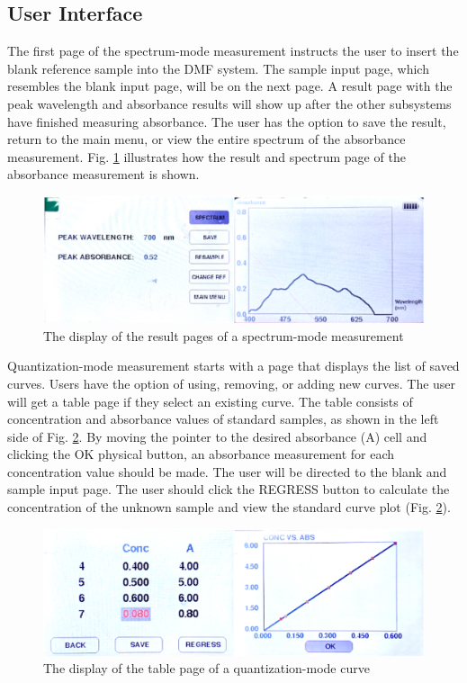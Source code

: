 \documentclass[conference]{IEEEtran}
\begin{document}
\subsection{User Interface}
The first page of the spectrum-mode measurement instructs the user to insert the blank reference sample into the DMF system.
The sample input page, which resembles the blank input page, will be on the next page.
A result page with the peak wavelength and absorbance results will show up after the other subsystems have finished measuring absorbance.
The user has the option to save the result, return to the main menu, or view the entire spectrum of the absorbance measurement.
Fig. \ref{lcd-spec} illustrates how the result and spectrum page of the absorbance measurement is shown.

    \begin{figure}[htbp]
    \centerline{\includegraphics[scale=0.06]{lcd-spec.JPEG}}
    \caption{The display of the result pages of a spectrum-mode measurement}
    \label{lcd-spec}
    \end{figure}

Quantization-mode measurement starts with a page that displays the list of saved curves.
Users have the option of using, removing, or adding new curves.
The user will get a table page if they select an existing curve.
The table consists of concentration and absorbance values of standard samples, as shown in the left side of Fig. \ref{lcd-conc}.
By moving the pointer to the desired absorbance (A) cell and clicking the OK physical button, an absorbance measurement for each concentration value should be made.
The user will be directed to the blank and sample input page.
The user should click the REGRESS button to calculate the concentration of the unknown sample and view the standard curve plot (Fig. \ref{lcd-conc}).

    \begin{figure}[htbp]
    \centerline{\includegraphics[scale=0.06]{lcd-conc.jpeg}}
    \caption{The display of the table page of a quantization-mode curve}
    \label{lcd-conc}
    \end{figure}
\end{document}
